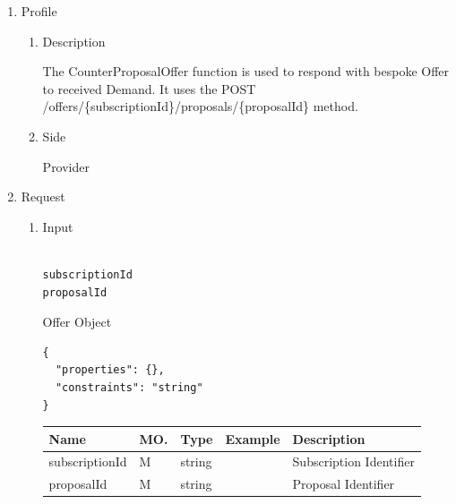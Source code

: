 \begin{enumerate}

\item Profile

\begin{enumerate}

\item Description

The CounterProposalOffer function is used to respond with bespoke Offer to received Demand. 
It uses the POST /offers/\{subscriptionId\}/proposals/\{proposalId\} method.

\item Side

Provider

\end{enumerate}

\item Request

\begin{enumerate}

\item Input

\begin{tcolorbox}[boxrule=0pt, frame empty]
\begin{verbatim}

subscriptionId
proposalId

\end{verbatim}
\end{tcolorbox}

Offer Object
\begin{tcolorbox}[boxrule=0pt, frame empty]
\begin{verbatim}
{
  "properties": {},
  "constraints": "string"
}
\end{verbatim}
\end{tcolorbox}

\begin{table}[H]
\footnotesize

\begin{center}
\begin{tabular}{|p{3cm}|l|p{3cm}|p{3cm}|p{4cm}|} 
\hline
\rowcolor{lightgray}	Name	& MO.	& Type	& Example & 	Description \\
\hline

subscriptionId	& M	& 	string			&		&	Subscription Identifier \\ 
\hline

proposalId		& M & 	string			&		&	Proposal Identifier \\
\hline	


\end{tabular}
\end{center}
\end{table}
\end{enumerate}
\end{enumerate}
